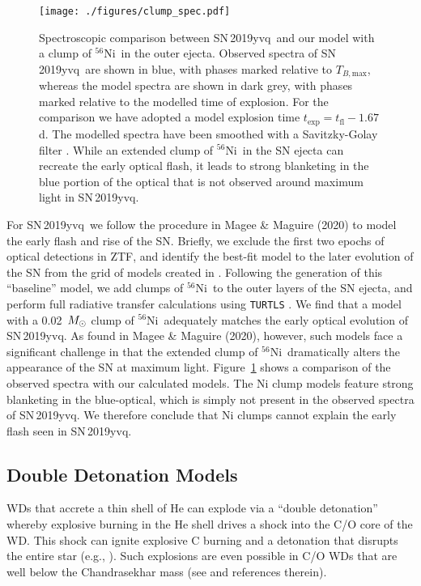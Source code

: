 \documentclass[twocolumn]{aastex63}
\newcommand{\tbmax}{$T_{B,\mathrm{max}}$}
\newcommand{\radni}{$^{56}$Ni}
\newcommand{\sn}{SN\,2019yvq}
\begin{document}
\begin{figure}
    \centering
    \texttt{[image: ./figures/clump\_spec.pdf]}
    \caption{Spectroscopic comparison between \sn\ and our model with a clump
    of \radni\ in the outer ejecta. Observed spectra of \sn\ are shown in
    blue, with phases marked relative to \tbmax, whereas the model spectra are
    shown in dark grey, with phases marked relative to the modelled time of
    explosion. For the comparison we have adopted a model explosion time
    $t_\mathrm{exp} = t_\mathrm{fl} - 1.67$\,d. The modelled spectra have been
    smoothed with a Savitzky-Golay filter \citep{Savitzky64}. While an
    extended clump of \radni\ in the SN ejecta can recreate the early optical
    flash, it leads to strong blanketing in the blue portion of the optical
    that is not observed around maximum light in \sn. }
    \label{fig:Ni_bullet}
\end{figure}

For \sn\ we follow the procedure in Magee \& Maguire (2020) to model the early
flash and rise of the SN. Briefly, we exclude the first two epochs of optical
detections in ZTF, and identify the best-fit model to the later evolution of
the SN from the grid of models created in \citet{Magee20}. Following the
generation of this ``baseline'' model, we add clumps of \radni\ to the outer
layers of the SN ejecta, and perform full radiative transfer calculations
using \texttt{TURTLS} \citep{Magee18}. We find that a model with a
0.02~$M_{\rm{\odot}}$ clump of \radni\ adequately matches the early optical
evolution of \sn. As found in Magee \& Maguire (2020), however, such models
face a significant challenge in that the extended clump of \radni\
dramatically alters the appearance of the SN at maximum light.
Figure~\ref{fig:Ni_bullet} shows a comparison of the observed spectra with our
calculated models. The Ni clump models feature strong blanketing in the
blue-optical, which is simply not present in the observed spectra of \sn. We
therefore conclude that Ni clumps cannot explain the early flash seen in \sn.

\subsection{Double Detonation Models}

WDs that accrete a thin shell of He can explode via a ``double detonation''
whereby explosive burning in the He shell drives a shock into the C/O core of
the WD. This shock can ignite explosive C burning and a detonation that
disrupts the entire star (e.g., \citealt{Nomoto82,Nomoto82a,Woosley94}). Such
explosions are even possible in C/O WDs that are well below the Chandrasekhar
mass (see \citealt{Fink07, Fink10} and references therein).
\end{document}
